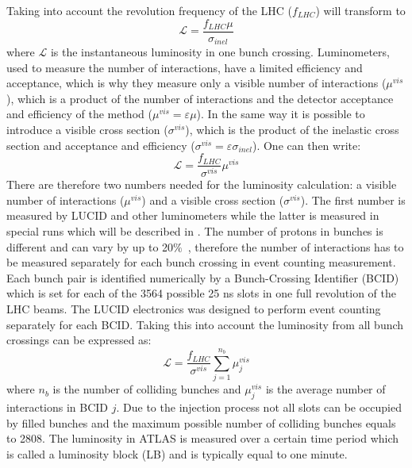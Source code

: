 Taking into account the revolution frequency of the LHC ($f_{LHC}$)  will transform to
\begin{equation}
\mathscr{L} = \dfrac{f_{LHC} \mu}{\sigma_{inel}}
\label{eq:lumi_average_mu}
\end{equation}
where $\mathscr{L}$ is the instantaneous luminosity in one bunch crossing.
Luminometers, used to measure the number of interactions, have a limited efficiency and acceptance, 
which is why they measure only a visible number of interactions ($\mu^{vis}$), which is a product of the number of interactions 
and the detector acceptance and efficiency of the method ($\mu^{vis} = \varepsilon \mu$).
In the same way it is possible to introduce a visible cross section ($\sigma^{vis}$), which is the product of the inelastic 
cross section and acceptance and efficiency ($\sigma^{vis} = \varepsilon \sigma_{inel}$).
One can then write:
\begin{equation}
\mathscr{L} = \dfrac{f_{LHC}}{\sigma^{vis}} \mu^{vis}
\label{eq:lumi_bunch_sum_visible}
\end{equation}
There are therefore two numbers needed for the luminosity calculation: a visible number of interactions ($\mu^{vis}$) and a visible cross section ($\sigma^{vis}$). 
The first number is measured by LUCID and other luminometers while the latter is measured in special runs which will be described in . 
The number of protons in bunches is different and can vary by up to 20$\%$~\cite{Aad:2013ucp}, 
therefore the number of interactions has to be measured separately for each bunch crossing in event counting measurement.
Each bunch pair is identified numerically by a Bunch-Crossing Identifier (BCID) which is set for each of the 3564 possible 25 ns slots in one full revolution of the LHC beams.
The LUCID electronics was designed to perform event counting separately for each BCID. 
Taking this into account the luminosity from all bunch crossings can be expressed as:
\begin{equation}
\mathscr{L} = \dfrac{f_{LHC}}{\sigma^{vis}} \sum_{j=1}^{n_{b}} \mu_{j}^{vis}
\label{eq:lumi_bunch_sum}
\end{equation}
where $n_{b}$ is the number of colliding bunches and $\mu_{j}^{vis}$ is the average number of interactions in BCID $j$.
Due to the injection process not all slots can be occupied by filled bunches and the maximum possible number of colliding bunches equals to 2808.
The luminosity  in ATLAS is measured over a certain time period which is called a luminosity block (LB) and is typically equal to one minute. 

